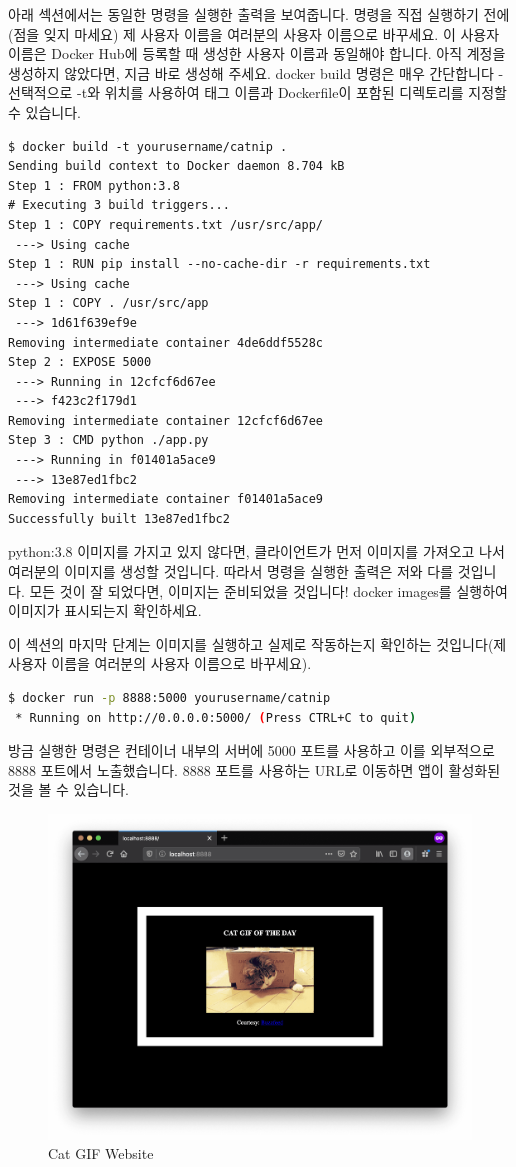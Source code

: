 아래 섹션에서는 동일한 명령을 실행한 출력을 보여줍니다. 명령을 직접 실행하기 전에(점을 잊지 마세요) 제 사용자 이름을 여러분의 사용자 이름으로 바꾸세요. 이 사용자 이름은 Docker Hub에 등록할 때 생성한 사용자 이름과 동일해야 합니다. 아직 계정을 생성하지 않았다면, 지금 바로 생성해 주세요. docker build 명령은 매우 간단합니다 - 선택적으로 -t와 위치를 사용하여 태그 이름과 Dockerfile이 포함된 디렉토리를 지정할 수 있습니다.
\begin{lstlisting}[language=Shell]
$ docker build -t yourusername/catnip .
Sending build context to Docker daemon 8.704 kB
Step 1 : FROM python:3.8
# Executing 3 build triggers...
Step 1 : COPY requirements.txt /usr/src/app/
 ---> Using cache
Step 1 : RUN pip install --no-cache-dir -r requirements.txt
 ---> Using cache
Step 1 : COPY . /usr/src/app
 ---> 1d61f639ef9e
Removing intermediate container 4de6ddf5528c
Step 2 : EXPOSE 5000
 ---> Running in 12cfcf6d67ee
 ---> f423c2f179d1
Removing intermediate container 12cfcf6d67ee
Step 3 : CMD python ./app.py
 ---> Running in f01401a5ace9
 ---> 13e87ed1fbc2
Removing intermediate container f01401a5ace9
Successfully built 13e87ed1fbc2
\end{lstlisting}

python:3.8 이미지를 가지고 있지 않다면, 클라이언트가 먼저 이미지를 가져오고 나서 여러분의 이미지를 생성할 것입니다. 따라서 명령을 실행한 출력은 저와 다를 것입니다. 모든 것이 잘 되었다면, 이미지는 준비되었을 것입니다! docker images를 실행하여 이미지가 표시되는지 확인하세요.

이 섹션의 마지막 단계는 이미지를 실행하고 실제로 작동하는지 확인하는 것입니다(제 사용자 이름을 여러분의 사용자 이름으로 바꾸세요).
\begin{lstlisting}[language=bash]
$ docker run -p 8888:5000 yourusername/catnip
 * Running on http://0.0.0.0:5000/ (Press CTRL+C to quit)
\end{lstlisting}

방금 실행한 명령은 컨테이너 내부의 서버에 5000 포트를 사용하고 이를 외부적으로 8888 포트에서 노출했습니다. 8888 포트를 사용하는 URL로 이동하면 앱이 활성화된 것을 볼 수 있습니다.

\begin{figure}
\includegraphics[width=\textwidth]{images/catgif.png}
\caption{Cat GIF Website}
\end{figure}

